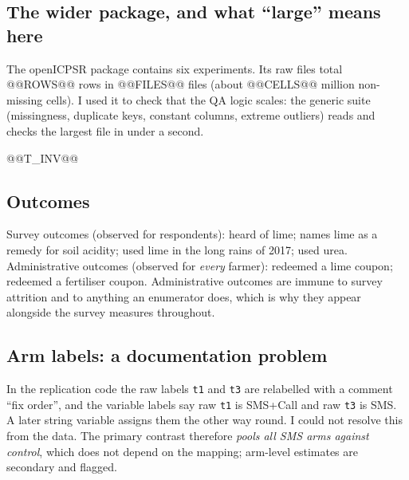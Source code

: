 \documentclass[11pt,a4paper]{article}
\newcommand{\real}{\textcolor{teal}{\sffamily\bfseries real data}}
\begin{document}
\subsection{The wider package, and what ``large'' means here}
The openICPSR package contains six experiments. Its raw files total @@ROWS@@ rows in @@FILES@@ files (about @@CELLS@@ million non-missing cells). I used it to check that the QA logic scales: the generic suite (missingness, duplicate keys, constant columns, extreme outliers) reads and checks the largest file in under a second.
\begin{table}[H]\centering\small\setlength{\tabcolsep}{6pt}@@T_INV@@\caption{Largest raw files in the package. \real}\end{table}

\subsection{Outcomes}
Survey outcomes (observed for respondents): heard of lime; names lime as a remedy for soil acidity; used lime in the long rains of 2017; used urea. Administrative outcomes (observed for \emph{every} farmer): redeemed a lime coupon; redeemed a fertiliser coupon. Administrative outcomes are immune to survey attrition and to anything an enumerator does, which is why they appear alongside the survey measures throughout.

\subsection{Arm labels: a documentation problem}
In the replication code the raw labels \texttt{t1} and \texttt{t3} are relabelled with a comment ``fix order'', and the variable labels say raw \texttt{t1} is SMS+Call and raw \texttt{t3} is SMS. A later string variable assigns them the other way round. I could not resolve this from the data. The primary contrast therefore \emph{pools all SMS arms against control}, which does not depend on the mapping; arm-level estimates are secondary and flagged.
\end{document}
